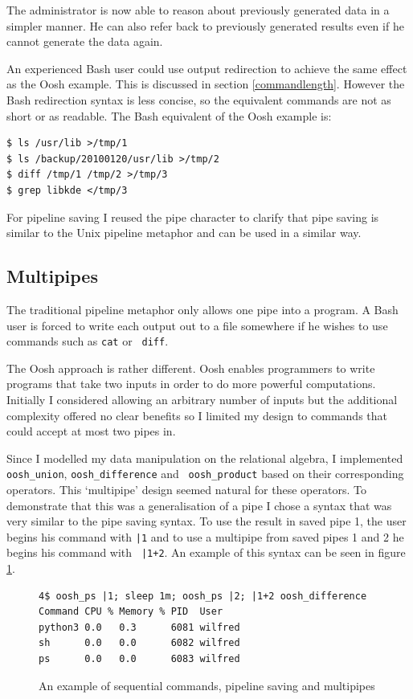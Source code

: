 \documentclass[12pt,twoside,notitlepage]{report}
\begin{document}
The administrator is now able to reason about previously generated data in a
simpler manner. He can also refer back to previously generated results
even if he cannot generate the data again.

An experienced Bash user could use output redirection to achieve the
same effect as the Oosh example. This is discussed in section
\ref{commandlength}. However the Bash redirection syntax is less
concise, so the equivalent commands are not as short or as
readable. The Bash equivalent of the Oosh example is:

\begin{verbatim}
$ ls /usr/lib >/tmp/1
$ ls /backup/20100120/usr/lib >/tmp/2
$ diff /tmp/1 /tmp/2 >/tmp/3
$ grep libkde </tmp/3
\end{verbatim}

For pipeline saving I reused the pipe character to clarify that pipe
saving is similar to the Unix pipeline metaphor and can be used in a
similar way.

\subsection{Multipipes}

The traditional pipeline metaphor only allows one pipe into a
program. A Bash user is forced to write each output out to a file
somewhere if he wishes to use commands such as {\tt cat} or {\tt
  diff}.

The Oosh approach is rather different. Oosh enables programmers to
write programs that take two inputs in order to do more powerful
computations. Initially I considered allowing an arbitrary number of
inputs but the additional complexity offered no clear benefits so I
limited my design to commands that could accept at most two pipes in.

Since I modelled my data manipulation on the relational algebra, I
implemented {\tt oosh\_union}, {\tt oosh\_difference} and {\tt
  oosh\_product} based on their corresponding operators. This
`multipipe' design seemed natural for these operators. To demonstrate
that this was a generalisation of a pipe I chose a syntax that was
very similar to the pipe saving syntax. To use the result in saved
pipe 1, the user begins his command with {\tt |1} and to use a
multipipe from saved pipes 1 and 2 he begins his command with {\tt
  |1+2}. An example of this syntax can be seen in figure \ref{multipipe}.

\begin{figure}[h]
\begin{verbatim}
4$ oosh_ps |1; sleep 1m; oosh_ps |2; |1+2 oosh_difference
Command CPU % Memory % PID  User
python3 0.0   0.3      6081 wilfred
sh      0.0   0.0      6082 wilfred
ps      0.0   0.0      6083 wilfred
\end{verbatim}
\caption{An example of sequential commands, pipeline saving and
  multipipes}
\label{multipipe}
\end{figure}
\end{document}
